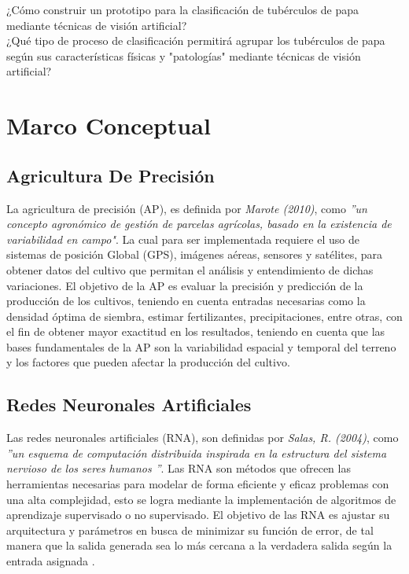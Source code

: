 ¿Cómo construir un prototipo para la clasificación de tubérculos de papa mediante técnicas de visión artificial?\\

¿Qué tipo de proceso de clasificación permitirá agrupar los tubérculos de papa según sus características físicas y "patologías" mediante técnicas de visión artificial?	


\chapter{Marco Conceptual}

\section{Agricultura De Precisión} La agricultura de precisión (AP), es definida por \textit{Marote (2010)}, como \textit{''un concepto agronómico de gestión de parcelas agrícolas, basado en la existencia de variabilidad en campo"}. La cual para ser implementada requiere el uso de sistemas de posición Global (GPS), imágenes aéreas, sensores y satélites, para obtener datos del cultivo que permitan el análisis y entendimiento de dichas variaciones. El objetivo de la AP es evaluar la precisión y predicción de la producción de los cultivos, teniendo en cuenta entradas necesarias como la densidad óptima de siembra, estimar fertilizantes, precipitaciones, entre otras, con el fin de obtener mayor exactitud en los resultados, teniendo en cuenta que las bases fundamentales de la AP son la variabilidad espacial y temporal del terreno y los factores que pueden afectar la producción del cultivo.\cite{agricultura} 


\section{Redes Neuronales Artificiales} Las redes neuronales artificiales (RNA), son definidas por \textit{Salas, R. (2004)}, como \textit{''un esquema de computación distribuida inspirada en la	estructura del sistema nervioso de los seres humanos ''}. Las RNA son métodos que ofrecen las herramientas necesarias para modelar de forma eficiente y eficaz problemas con una alta complejidad, esto se logra mediante la implementación de algoritmos de aprendizaje supervisado o no supervisado. El objetivo de las RNA es ajustar su arquitectura y parámetros en busca de minimizar su función de error, de tal manera que la salida generada sea lo más cercana a la verdadera salida según la entrada asignada \cite{redes}.

